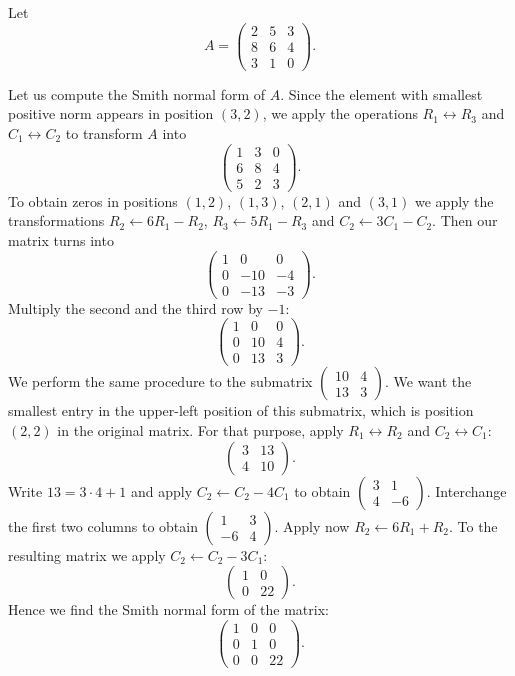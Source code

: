 \begin{example}
Let 
\[
A=\begin{pmatrix}
2 & 5 & 3\\
8 & 6 & 4\\
3 & 1 & 0
\end{pmatrix}.
\]

Let us compute the Smith normal form of $A$.
Since the element with smallest positive norm appears in position $(3,2)$,
we apply the operations $R_1\leftrightarrow R_3$ and 
$C_1\leftrightarrow C_2$ to transform $A$ into 
\[
\begin{pmatrix}
	1 & 3 & 0\\
	6 & 8 & 4\\
	5 & 2 & 3
\end{pmatrix}.
\]
To obtain zeros in positions $(1,2)$, $(1,3)$, $(2,1)$ and $(3,1)$ we 
apply the transformations 
$R_2\leftarrow 6R_1-R_2$, $R_3\leftarrow 5R_1-R_3$ and 
$C_2\leftarrow 3C_1-C_2$. Then our matrix turns into   
\[
\begin{pmatrix}
	1 & 0 & 0\\
	0 & -10 & -4\\
	0 & -13 & -3
\end{pmatrix}.
\]
Multiply the second and the third row 
by $-1$:
\[
\begin{pmatrix}
	1 & 0 & 0\\
	0 & 10 & 4\\
	0 & 13 & 3
\end{pmatrix}.
\]
We perform the same procedure to the submatrix
$\begin{pmatrix}10&4\\13&3\end{pmatrix}$.  We want the smallest entry in the
upper-left position of this submatrix, which is position $(2,2)$ in the
original matrix.  For that purpose, apply $R_1\leftrightarrow R_2$ and
$C_2\leftrightarrow C_1$:
\[ 
\begin{pmatrix}
3 & 13\\
4 & 10
\end{pmatrix}.
\]
Write $13=3\cdot 4+1$ and apply 
$C_2\leftarrow C_2-4C_1$ to obtain $\begin{pmatrix}3&1\\4&-6\end{pmatrix}$. Interchange 
the first two columns to obtain 
$\begin{pmatrix}1&3\\-6&4\end{pmatrix}$. Apply now 
$R_2\leftarrow 6R_1+R_2$. To the resulting matrix we apply
$C_2\leftarrow C_2-3C_1$:
\[
\begin{pmatrix}
    1 & 0\\
    0 & 22
\end{pmatrix}.
\]
Hence we find the Smith normal form of the matrix: 
\[
\begin{pmatrix}
	1 & 0 & 0\\
	0 & 1 & 0\\
	0 & 0 & 22	
\end{pmatrix}.
\]
\end{example}

